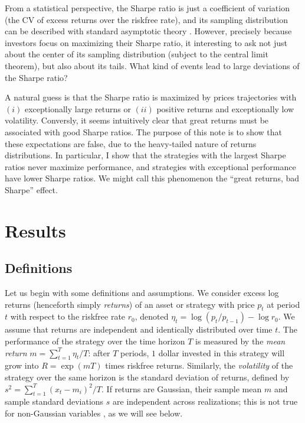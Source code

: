 \documentclass[
reprint,
amsmath,amssymb,
aps,
]{revtex4-2}
\begin{document}
From a statistical perspective, the Sharpe ratio is just a coefficient of variation (the CV of excess returns over the riskfree rate), and its sampling distribution can be described with standard asymptotic theory \cite{loStatistics2002}. 
However, precisely because investors focus on maximizing their Sharpe ratio, it interesting to ask not just about the center of its sampling distribution (subject to the central limit theorem), but also about its tails. What kind of events lead to large deviations of the Sharpe ratio? 

A natural guess is that the Sharpe ratio is maximized by prices trajectories with $(i)$ exceptionally large returns or $(ii)$ positive returns and exceptionally low volatility. 
Conversly, it seems intuitively clear that great returns must be associated with good Sharpe ratios. 
The purpose of this note is to show that these expectations are false, due to the heavy-tailed nature of returns distributions. 
In particular, I show that the strategies with the largest Sharpe ratios never maximize performance, and strategies with exceptional performance have lower Sharpe ratios. 
We might call this phenomenon the ``great returns, bad Sharpe'' effect.  

\section{Results}

\subsection{Definitions}

Let us begin with some definitions and assumptions. 
We consider excess log returns (henceforth simply \emph{returns}) of an asset or strategy with price $p_{t}$ at period $t$ with respect to the riskfree rate $r_0$, denoted $\eta_{t} = \log(p_{t}/p_{t-1}) - \log r_0$. 
We assume that returns are independent and identically distributed over time $t$. 
The performance of the strategy over the time horizon $T$ is measured by the \emph{mean return} $m = \sum_{t=1}^T \eta_{t}/T$: after $T$ periods, $1$ dollar invested in this strategy will grow into $R = \exp(mT)$ times riskfree returns. 
Similarly, the \emph{volatility} of the strategy over the same horizon is the standard deviation of returns, defined by $s^2 = \sum_{t=1}^T (x_{t} - m_i)^2/T$. 
If returns are Gaussian, their sample mean $m$ and sample standard deviations $s$ are independent across realizations; this is not true for non-Gaussian variables \cite{gearyDistribution1936,springerJoint1953}, as we will see below. 
\end{document}
